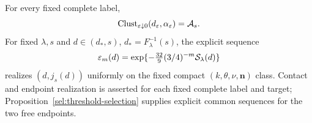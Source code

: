 \begin{proposition}
\label{path:realization}
For every fixed complete label,
\[
 \operatorname{Clust}_{\varepsilon\downarrow0}(d_\varepsilon,\alpha_\varepsilon)=\mathcal A_s.
\]
For fixed $\lambda,s$ and $d\in(d_*,s)$, $d_*=F_\lambda^{-1}(s)$,
the explicit sequence
\begin{equation}
 \varepsilon_m(d)=\exp\{-\tfrac{32}{9}(3/4)^{-m}
                                  \mathcal S_\lambda(d)\}
 \label{path:common-free-sequence}
\end{equation}
realizes $(d,j_s(d))$ uniformly on the fixed compact
$(k,\theta,\nu,\mathbf n)$ class. Contact and endpoint
realization is asserted for each fixed complete label and target;
Proposition~\ref{sel:threshold-selection} supplies explicit common
sequences for the two free endpoints.
\end{proposition}


